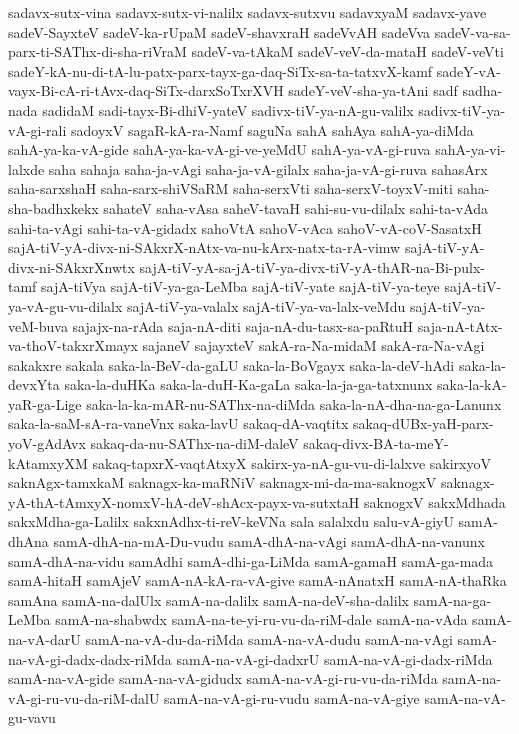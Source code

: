 {sadavx-sutx-vina
sadavx-sutx-vi-nalilx
sadavx-sutxvu
sadavxyaM
sadavx-yave
sadeV-SayxteV
sadeV-ka-rUpaM
sadeV-shavxraH
sadeVvAH
sadeVva
sadeV-va-sa-parx-ti-SAThx-di-sha-riVraM
sadeV-va-tAkaM
sadeV-veV-da-mataH
sadeV-veVti
sadeY-kA-nu-di-tA-lu-patx-parx-tayx-ga-daq-SiTx-sa-ta-tatxvX-kamf
sadeY-vA-vayx-Bi-cA-ri-tAvx-daq-SiTx-darxSoTxrXVH
sadeY-veV-sha-ya-tAni
sadf
sadha-nada
sadidaM
sadi-tayx-Bi-dhiV-yateV
sadivx-tiV-ya-nA-gu-valilx
sadivx-tiV-ya-vA-gi-rali
sadoyxV
sagaR-kA-ra-Namf
saguNa
sahA
sahAya
sahA-ya-diMda
sahA-ya-ka-vA-gide
sahA-ya-ka-vA-gi-ve-yeMdU
sahA-ya-vA-gi-ruva
sahA-ya-vi-lalxde
saha
sahaja
saha-ja-vAgi
saha-ja-vA-gilalx
saha-ja-vA-gi-ruva
sahasArx
saha-sarxshaH
saha-sarx-shiVSaRM
saha-serxVti
saha-serxV-toyxV-miti
saha-sha-badhxkekx
sahateV
saha-vAsa
saheV-tavaH
sahi-su-vu-dilalx
sahi-ta-vAda
sahi-ta-vAgi
sahi-ta-vA-gidadx
sahoVtA
sahoV-vAca
sahoV-vA-coV-SasatxH
sajA-tiV-yA-divx-ni-SAkxrX-nAtx-va-nu-kArx-natx-ta-rA-vimw
sajA-tiV-yA-divx-ni-SAkxrXnwtx
sajA-tiV-yA-sa-jA-tiV-ya-divx-tiV-yA-thAR-na-Bi-pulx-tamf
sajA-tiVya
sajA-tiV-ya-ga-LeMba
sajA-tiV-yate
sajA-tiV-ya-teye
sajA-tiV-ya-vA-gu-vu-dilalx
sajA-tiV-ya-valalx
sajA-tiV-ya-va-lalx-veMdu
sajA-tiV-ya-veM-buva
sajajx-na-rAda
saja-nA-diti
saja-nA-du-tasx-sa-paRtuH
saja-nA-tAtx-va-thoV-takxrXmayx
sajaneV
sajayxteV
sakA-ra-Na-midaM
sakA-ra-Na-vAgi
sakakxre
sakala
saka-la-BeV-da-gaLU
saka-la-BoVgayx
saka-la-deV-hAdi
saka-la-devxYta
saka-la-duHKa
saka-la-duH-Ka-gaLa
saka-la-ja-ga-tatxnunx
saka-la-kA-yaR-ga-Lige
saka-la-ka-mAR-nu-SAThx-na-diMda
saka-la-nA-dha-na-ga-Lanunx
saka-la-saM-sA-ra-vaneVnx
saka-lavU
sakaq-dA-vaqtitx
sakaq-dUBx-yaH-parx-yoV-gAdAvx
sakaq-da-nu-SAThx-na-diM-daleV
sakaq-divx-BA-ta-meY-kAtamxyXM
sakaq-tapxrX-vaqtAtxyX
sakirx-ya-nA-gu-vu-di-lalxve
sakirxyoV
saknAgx-tamxkaM
saknagx-ka-maRNiV
saknagx-mi-da-ma-saknogxV
saknagx-yA-thA-tAmxyX-nomxV-hA-deV-shAcx-payx-va-sutxtaH
saknogxV
sakxMdhada
sakxMdha-ga-Lalilx
sakxnAdhx-ti-reV-keVNa
sala
salalxdu
salu-vA-giyU
samA-dhAna
samA-dhA-na-mA-Du-vudu
samA-dhA-na-vAgi
samA-dhA-na-vanunx
samA-dhA-na-vidu
samAdhi
samA-dhi-ga-LiMda
samA-gamaH
samA-ga-mada
samA-hitaH
samAjeV
samA-nA-kA-ra-vA-give
samA-nAnatxH
samA-nA-thaRka
samAna
samA-na-dalUlx
samA-na-dalilx
samA-na-deV-sha-dalilx
samA-na-ga-LeMba
samA-na-shabwdx
samA-na-te-yi-ru-vu-da-riM-dale
samA-na-vAda
samA-na-vA-darU
samA-na-vA-du-da-riMda
samA-na-vA-dudu
samA-na-vAgi
samA-na-vA-gi-dadx-dadx-riMda
samA-na-vA-gi-dadxrU
samA-na-vA-gi-dadx-riMda
samA-na-vA-gide
samA-na-vA-gidudx
samA-na-vA-gi-ru-vu-da-riMda
samA-na-vA-gi-ru-vu-da-riM-dalU
samA-na-vA-gi-ru-vudu
samA-na-vA-giye
samA-na-vA-gu-vavu
}
